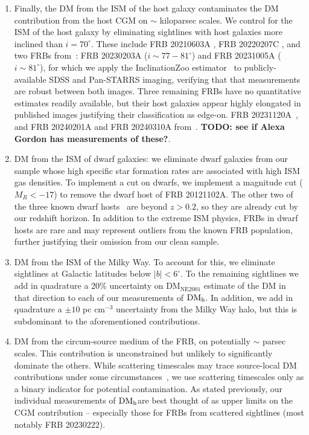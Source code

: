 \documentclass[twocolumn]{aastex631}
\newcommand{\dmh}{\ensuremath{{\rm DM}_\textrm{h}}}
\begin{document}
\begin{enumerate}
    \item Finally, the DM from the ISM of the host galaxy contaminates the DM contribution from the host CGM on $\sim$ kiloparsec scales. We control for the ISM of the host galaxy by eliminating sightlines with host galaxies more inclined than $i = 70^\circ$. These include FRB 20210603A \citep[$i \sim 83^\circ$; ][]{cassanelli2024fast}, FRB 20220207C \citep[$i \sim 74-80^\circ$;][]{law2024deep,bhardwaj2024selection}, and two FRBs from~\citep{chime2024catalog}: FRB 20230203A ($i \sim 77-81^\circ$) and FRB 20231005A ($i \sim 81^\circ$), for which we apply the InclinationZoo estimator~\citep{kourkchi2020cosmicflows} to publicly-available SDSS and Pan-STARRS imaging, verifying that that measurements are robust between both images. Three remaining FRBs have no quantitative estimates readily available, but their host galaxies appear highly elongated in published images justifying their classification as edge-on. FRB 20231120A~\citep{sharma2024preferential}, and FRB 20240201A and FRB 20240310A from~\citet{shannon2024commensal}. \textbf{TODO: see if Alexa Gordon has measurements of these?}.
    \item DM from the ISM of dwarf galaxies: we eliminate dwarf galaxies from our sample whose high specific star formation rates are associated with high ISM gas densities. To implement a cut on dwarfs, we implement a magnitude cut ($M_R < -17$) to remove the dwarf host of FRB 20121102A. The other two of the three known dwarf hosts~\citep[FRB 20190520B \& 20210117A][]{bhandari2023nonrepeating,hewitt2024repeating} are beyond $z > 0.2$, so they are already cut by our redshift horizon. In addition to the extreme ISM physics, FRBs in dwarf hosts are rare and may represent outliers from the known FRB population, further justifying their omission from our clean sample.
    \item DM from the ISM of the Milky Way. To account for this, we eliminate sightlines at Galactic latitudes below $|b| < 6^\circ$. To the remaining sightlines we add in quadrature a 20\% uncertainty on DM$_\mathrm{NE2001}$ estimate of the DM in that direction to each of our measurements of \dmh. In addition, we add in quadrature a $\pm10$ pc cm$^{-3}$ uncertainty from the Milky Way halo, but this is subdominant to the aforementioned contributions.
    \item DM from the circum-source medium of the FRB, on potentially $\sim$ parsec scales. This contribution is unconstrained but unlikely to significantly dominate the others. While scattering timescales may trace source-local DM contributions under some circumstances~\citep{cordes2022redshift}, we use scattering timescales only as a binary indicator for potential contamination. As stated previously, our individual measurements of \dmh are best thought of as upper limits on the CGM contribution -- especially those for FRBs from scattered sightlines (most notably FRB 20230222).

\end{enumerate}
\end{document}
